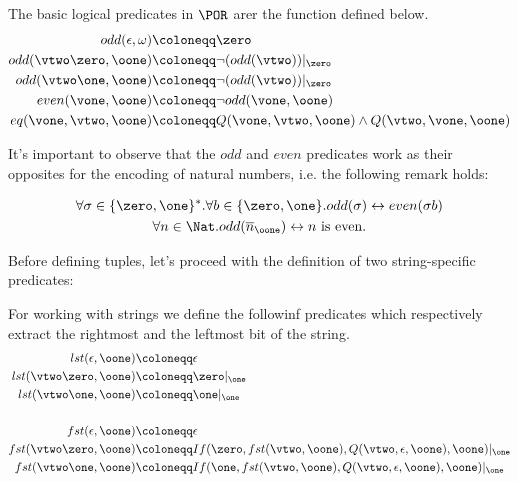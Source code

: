 \begin{defn}
The basic logical predicates in $\POR$ arer the function defined below.
\begin{align*}
odd(\epsilon, \omega) &\coloneqq \zero\\
odd(\vtwo \zero, \oone) &\coloneqq \lnot (odd(\vtwo))|_{\zero}\\
odd(\vtwo \one, \oone) &\coloneqq \lnot (odd(\vtwo))|_{\zero}\\
even(\vone, \oone)&\coloneqq \lnot odd(\vone, \oone)\\
eq(\vone, \vtwo, \oone)&\coloneqq Q(\vone, \vtwo, \oone)\land Q(\vtwo, \vone, \oone)
\end{align*}
\end{defn}
It's important to observe that the $odd$ and $even$ predicates work as their opposites for the encoding of natural numbers, i.e. the following remark holds:

\begin{remark}
\[
\begin{gathered}
\forall \sigma \in \{\zero, \one\}^*.\forall b \in \{\zero,\one\}. odd(\sigma)\leftrightarrow even (\sigma b)\\
\forall n \in \Nat. odd(\overline n_\oone) \leftrightarrow n\text{ is even.}
\end{gathered}
\]
\end{remark}

Before defining tuples, let's proceed with the definition of two string-specific predicates:

\begin{defn}
For working with strings we define the followinf predicates which respectively extract the rightmost and the leftmost bit of the string.
\begin{align*}
lst(\epsilon, \oone) &\coloneqq \epsilon\\
lst(\vtwo \zero, \oone) &\coloneqq \zero|_{\one}\\
lst(\vtwo \one, \oone) &\coloneqq \one|_{\one}\\\\
fst(\epsilon, \oone) &\coloneqq \epsilon\\
fst(\vtwo \zero, \oone) &\coloneqq If(\zero, fst(\vtwo, \oone), Q(\vtwo, \epsilon, \oone), \oone)|_{\one}\\
fst(\vtwo \one, \oone) &\coloneqq If(\one, fst(\vtwo, \oone), Q(\vtwo, \epsilon, \oone), \oone)|_{\one}\\
\end{align*}

\end{defn}

